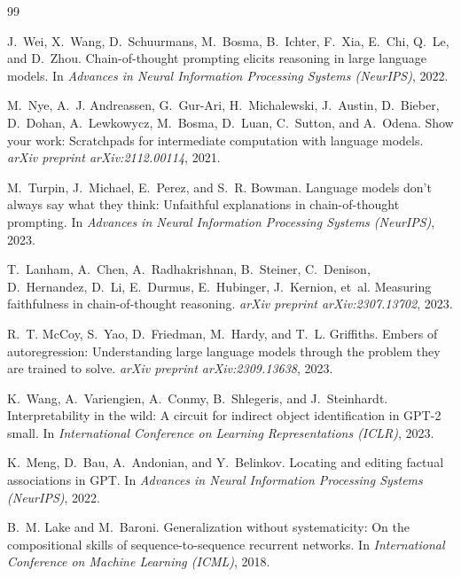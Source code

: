 \documentclass[11pt]{article}
\begin{document}

\begin{thebibliography}{99}

J.~Wei, X.~Wang, D.~Schuurmans, M.~Bosma, B.~Ichter, F.~Xia, E.~Chi,
Q.~Le, and D.~Zhou.
\newblock Chain-of-thought prompting elicits reasoning in large language models.
\newblock In \emph{Advances in Neural Information Processing Systems (NeurIPS)}, 2022.

M.~Nye, A.~J. Andreassen, G.~Gur-Ari, H.~Michalewski, J.~Austin, D.~Bieber,
D.~Dohan, A.~Lewkowycz, M.~Bosma, D.~Luan, C.~Sutton, and A.~Odena.
\newblock Show your work: Scratchpads for intermediate computation with language models.
\newblock \emph{arXiv preprint arXiv:2112.00114}, 2021.

M.~Turpin, J.~Michael, E.~Perez, and S.~R. Bowman.
\newblock Language models don't always say what they think: Unfaithful
explanations in chain-of-thought prompting.
\newblock In \emph{Advances in Neural Information Processing Systems (NeurIPS)}, 2023.

T.~Lanham, A.~Chen, A.~Radhakrishnan, B.~Steiner, C.~Denison, D.~Hernandez,
D.~Li, E.~Durmus, E.~Hubinger, J.~Kernion, et~al.
\newblock Measuring faithfulness in chain-of-thought reasoning.
\newblock \emph{arXiv preprint arXiv:2307.13702}, 2023.

R.~T. McCoy, S.~Yao, D.~Friedman, M.~Hardy, and T.~L. Griffiths.
\newblock Embers of autoregression: Understanding large language models
through the problem they are trained to solve.
\newblock \emph{arXiv preprint arXiv:2309.13638}, 2023.

K.~Wang, A.~Variengien, A.~Conmy, B.~Shlegeris, and J.~Steinhardt.
\newblock Interpretability in the wild: A circuit for indirect object
identification in GPT-2 small.
\newblock In \emph{International Conference on Learning Representations (ICLR)}, 2023.

K.~Meng, D.~Bau, A.~Andonian, and Y.~Belinkov.
\newblock Locating and editing factual associations in GPT.
\newblock In \emph{Advances in Neural Information Processing Systems (NeurIPS)}, 2022.

B.~M. Lake and M.~Baroni.
\newblock Generalization without systematicity: On the compositional skills
of sequence-to-sequence recurrent networks.
\newblock In \emph{International Conference on Machine Learning (ICML)}, 2018.


\end{thebibliography}
\end{document}
